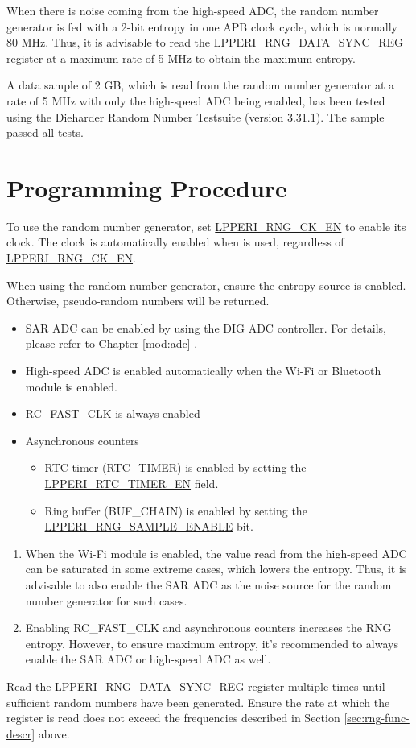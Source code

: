 \documentclass[main\_\_EN.tex]{subfiles}
\begin{document}
When there is noise coming from the high-speed ADC, the random number generator is fed with a 2-bit entropy in one APB clock cycle, which is normally 80 MHz. Thus, it is advisable to read the \hyperref[regdesc:LPPERIRNGDATASYNCREG]{LPPERI\_RNG\_DATA\_SYNC\_REG}
register at a maximum rate of 5 MHz to obtain the maximum entropy.

A data sample of 2 GB, which is read from the random number generator at a rate of 5 MHz with only the high-speed ADC being enabled, has been tested using the Dieharder Random Number Testsuite (version 3.31.1). The sample passed all tests.


\section{Programming Procedure}

To use the random number generator, set \hyperref[fielddesc:LPPERIRNGCKEN]{LPPERI\_RNG\_CK\_EN} to enable its clock. The clock is automatically enabled when  is used, regardless of
\hyperref[fielddesc:LPPERIRNGCKEN]{LPPERI\_RNG\_CK\_EN}.

When using the random number generator, ensure the entropy source is enabled. Otherwise, pseudo-random numbers will be returned.
\begin{itemize}
    \item SAR ADC can be enabled by using the DIG ADC controller. For details, please refer to Chapter \ref{mod:adc} \textit{}.
    \item High-speed ADC is enabled automatically when the Wi-Fi or Bluetooth module is enabled.
    \item RC\_FAST\_CLK is always enabled
    \item Asynchronous counters
        \begin{itemize}
            \item RTC timer (RTC\_TIMER) is enabled by setting the \hyperref[fielddesc:LPPERIRTCTIMEREN]{LPPERI\_RTC\_TIMER\_EN} field.
            \item Ring buffer (BUF\_CHAIN) is enabled by setting the \hyperref[fielddesc:LPPERIRNGSAMPLEENABLE]{LPPERI\_RNG\_SAMPLE\_ENABLE} bit.
        \end{itemize}
\end{itemize}

\begin{tiplisting}\label{others:rng-note-clock-seed}
\vspace{-2.5em}
\begin{enumerate}
    \item When the Wi-Fi module is enabled, the value read from the high-speed ADC can be saturated in some extreme cases, which lowers the entropy. Thus, it is advisable to also enable the SAR ADC as the noise source for the random number generator for such cases.
    \item Enabling RC\_FAST\_CLK and asynchronous counters increases the RNG entropy. However, to ensure maximum entropy, it’s recommended to always enable the SAR ADC or high-speed ADC as well.
\end{enumerate}
\end{tiplisting}

Read the \hyperref[regdesc:LPPERIRNGDATASYNCREG]{LPPERI\_RNG\_DATA\_SYNC\_REG} register multiple times until sufficient random numbers have been generated. Ensure the rate at which the register is read does not exceed the frequencies described in Section \ref{sec:rng-func-descr} above.
\end{document}
